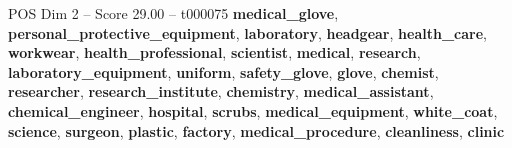 \begin{textsample}{POS Dim 2 – Score 29.00 – t000075}  \label{ex:f2_pos_025}
\textbf{medical\_glove}, \textbf{personal\_protective\_equipment}, \textbf{laboratory}, \textbf{headgear}, \textbf{health\_care}, \textbf{workwear}, \textbf{health\_professional}, \textbf{scientist}, \textbf{medical}, \textbf{research}, \textbf{laboratory\_equipment}, \textbf{uniform}, \textbf{safety\_glove}, \textbf{glove}, \textbf{chemist}, \textbf{researcher}, \textbf{research\_institute}, \textbf{chemistry}, \textbf{medical\_assistant}, \textbf{chemical\_engineer}, \textbf{hospital}, \textbf{scrubs}, \textbf{medical\_equipment}, \textbf{white\_coat}, \textbf{science}, \textbf{surgeon}, \textbf{plastic}, \textbf{factory}, \textbf{medical\_procedure}, \textbf{cleanliness}, \textbf{clinic}

\end{textsample}
